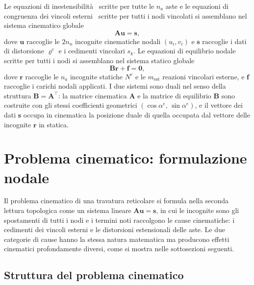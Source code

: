 Le equazioni di inestensibilità~
scritte per tutte le $n_a$ aste e le equazioni di
congruenza dei vincoli esterni~
scritte per tutti i nodi vincolati si assemblano nel
sistema cinematico globale
\[
\bm{A}\bm{u} = \bm{s},
\]
dove $\bm{u}$ raccoglie le $2n_n$ incognite cinematiche
nodali $(u_i, v_i)$ e $\bm{s}$ raccoglie i dati di
distorsione $\varrho^e$ e i cedimenti vincolari $s_k$.
Le equazioni di equilibrio nodale~
scritte per tutti i nodi si assemblano nel sistema
statico globale
\[
\bm{B}\bm{r} + \bm{f} = \bm{0},
\]
dove $\bm{r}$ raccoglie le $n_a$ incognite statiche
$N^e$ e le $m_\text{est}$ reazioni vincolari esterne,
e $\bm{f}$ raccoglie i carichi nodali applicati.
I due sistemi sono duali nel senso della struttura
$\bm{B} = \bm{A}^\top$: la matrice cinematica $\bm{A}$
e la matrice di equilibrio $\bm{B}$ sono costruite con
gli stessi coefficienti geometrici $(\cos\alpha^e,\,
\sin\alpha^e)$, e il vettore dei dati $\bm{s}$ occupa
in cinematica la posizione duale di quella occupata
dal vettore delle incognite $\bm{r}$ in statica.


\section{Problema cinematico: formulazione nodale}
\label{sec:cinematica_reticolari}

Il problema cinematico di una travatura reticolare
si formula nella seconda lettura topologica
come un sistema lineare $\bm{A}\bm{u} = \bm{s}$,
in cui le incognite sono gli spostamenti di tutti
i nodi e i termini noti raccolgono le cause cinematiche: i cedimenti dei vincoli esterni e
le distorsioni estensionali delle aste. Le due
categorie di cause hanno la stessa natura matematica
ma producono effetti cinematici profondamente diversi,
come si mostra nelle sottosezioni seguenti.


\subsection{Struttura del problema cinematico}
\label{subsec:struttura_cinematica}

